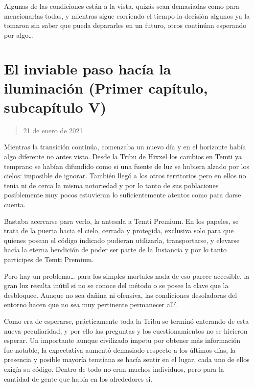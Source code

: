 \documentclass[
  spanish,
]{book}
\begin{document}
Algunas de las condiciones están a la vista, quizás sean demasiadas como para mencionarlas todas, y mientras sigue corriendo el tiempo la decisión algunos ya la tomaron sin saber que pueda depararles en un futuro, otros continúan esperando por algo\ldots{}

\hypertarget{el-inviable-paso-hacuxeda-la-iluminaciuxf3n-primer-capuxedtulo-subcapuxedtulo-v}{%
\section{El inviable paso hacía la iluminación (Primer capítulo, subcapítulo V)}\label{el-inviable-paso-hacuxeda-la-iluminaciuxf3n-primer-capuxedtulo-subcapuxedtulo-v}}

\begin{quote}
21 de enero de 2021
\end{quote}

Mientras la transición continúa, comenzaba un nuevo día y en el horizonte había algo diferente no antes visto. Desde la Tribu de Hixxel los cambios en Temti ya temprano se habían difundido como si una fuente de luz se hubiera alzado por los cielos: imposible de ignorar. También llegó a los otros territorios pero en ellos no tenía ni de cerca la misma notoriedad y por lo tanto de sus poblaciones posiblemente muy pocos estuvieran lo suficientemente atentos como para darse cuenta.

Bastaba acercarse para verlo, la antesala a Temti Premium. En los papeles, se trata de la puerta hacia el cielo, cerrada y protegida, exclusiva solo para que quienes posean el código indicado pudieran utilizarla, transportarse, y elevarse hacía la eterna bendición de poder ser parte de la Instancia y por lo tanto participes de Temti Premium.

Pero hay un problema\ldots{} para los simples mortales nada de eso parece accesible, la gran luz resulta inútil si no se conoce del método o se posee la clave que la desbloquee. Aunque no sea dañina ni ofensiva, las condiciones desoladoras del entorno hacen que no sea muy pertinente permanecer allí.

Como era de esperarse, prácticamente toda la Tribu se terminó enterando de esta nueva peculiaridad, y por ello las preguntas y los cuestionamientos no se hicieron esperar. Un importante aunque civilizado ímpetu por obtener más información fue notable, la expectativa aumentó demasiado respecto a los últimos días, la presencia y posible mayoría temtiana se hacía sentir en el lugar, cada uno de ellos exigía su código. Dentro de todo no eran muchos individuos, pero para la cantidad de gente que había en los alrededores si.
\end{document}
